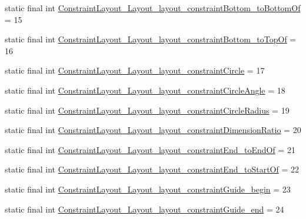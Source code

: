 \begin{DoxyCompactItemize}
\item 
static final int \mbox{\hyperlink{classandroid_1_1support_1_1constraint_1_1_r_1_1styleable_a1008cefb94a6dbb214df4a61fba4c37e}{Constraint\+Layout\+\_\+\+Layout\+\_\+layout\+\_\+constraint\+Bottom\+\_\+to\+Bottom\+Of}} = 15
\item 
static final int \mbox{\hyperlink{classandroid_1_1support_1_1constraint_1_1_r_1_1styleable_a0984ad235d497a29196d0e910309450a}{Constraint\+Layout\+\_\+\+Layout\+\_\+layout\+\_\+constraint\+Bottom\+\_\+to\+Top\+Of}} = 16
\item 
static final int \mbox{\hyperlink{classandroid_1_1support_1_1constraint_1_1_r_1_1styleable_a6a3eb173eaa12eab5e8e208b74b5df71}{Constraint\+Layout\+\_\+\+Layout\+\_\+layout\+\_\+constraint\+Circle}} = 17
\item 
static final int \mbox{\hyperlink{classandroid_1_1support_1_1constraint_1_1_r_1_1styleable_a590db9003f1c318b8e086e6b3f87c66e}{Constraint\+Layout\+\_\+\+Layout\+\_\+layout\+\_\+constraint\+Circle\+Angle}} = 18
\item 
static final int \mbox{\hyperlink{classandroid_1_1support_1_1constraint_1_1_r_1_1styleable_ab048d0be2a2d8861a44b07d087355c61}{Constraint\+Layout\+\_\+\+Layout\+\_\+layout\+\_\+constraint\+Circle\+Radius}} = 19
\item 
static final int \mbox{\hyperlink{classandroid_1_1support_1_1constraint_1_1_r_1_1styleable_a434e491e33ab7e798a7ff01ec3f478d1}{Constraint\+Layout\+\_\+\+Layout\+\_\+layout\+\_\+constraint\+Dimension\+Ratio}} = 20
\item 
static final int \mbox{\hyperlink{classandroid_1_1support_1_1constraint_1_1_r_1_1styleable_ab29c135647b193122a4223b973c2f2a8}{Constraint\+Layout\+\_\+\+Layout\+\_\+layout\+\_\+constraint\+End\+\_\+to\+End\+Of}} = 21
\item 
static final int \mbox{\hyperlink{classandroid_1_1support_1_1constraint_1_1_r_1_1styleable_a206aa416984b55033def86a8af9293b0}{Constraint\+Layout\+\_\+\+Layout\+\_\+layout\+\_\+constraint\+End\+\_\+to\+Start\+Of}} = 22
\item 
static final int \mbox{\hyperlink{classandroid_1_1support_1_1constraint_1_1_r_1_1styleable_a5db2133f0b11d116ffcf7ea98162fbb4}{Constraint\+Layout\+\_\+\+Layout\+\_\+layout\+\_\+constraint\+Guide\+\_\+begin}} = 23
\item 
static final int \mbox{\hyperlink{classandroid_1_1support_1_1constraint_1_1_r_1_1styleable_afd7624a026a509c404645497a0052dd5}{Constraint\+Layout\+\_\+\+Layout\+\_\+layout\+\_\+constraint\+Guide\+\_\+end}} = 24

\end{DoxyCompactItemize}
